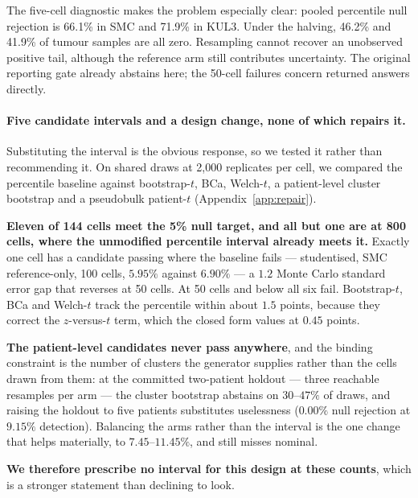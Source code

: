 The five-cell diagnostic makes the problem especially clear: pooled
percentile null rejection is 66.1\% in SMC and 71.9\% in KUL3.
Under the halving, 46.2\% and 41.9\% of tumour samples are all zero.
Resampling cannot recover an unobserved positive tail, although the reference
arm still contributes uncertainty. The original reporting gate already
abstains here; the 50-cell failures concern returned answers directly.

\paragraph{Five candidate intervals and a design change, none of which repairs
it.} Substituting the interval is the obvious response, so we tested it rather
than recommending it. On shared draws at 2{,}000 replicates per cell, we
compared the percentile baseline against bootstrap-$t$, BCa, Welch-$t$, a
patient-level cluster bootstrap and a pseudobulk patient-$t$
(Appendix~\ref{app:repair}).

\textbf{Eleven of 144 cells meet the 5\% null target, and all but one are at
800 cells, where the unmodified percentile interval already meets it.} Exactly
one cell has a candidate passing where the baseline fails --- studentised, SMC
reference-only, 100 cells, $5.95\%$ against $6.90\%$ --- a $1.2$ Monte Carlo
standard error gap that reverses at 50 cells. At 50 cells and below all six
fail. Bootstrap-$t$, BCa and Welch-$t$ track the percentile within about
$1.5$ points, because they correct the $z$-versus-$t$ term, which the closed
form values at $0.45$ points.

\textbf{The patient-level candidates never pass anywhere}, and the binding
constraint is the number of clusters the generator supplies rather than the
cells drawn from them: at the committed two-patient holdout --- three
reachable resamples per arm --- the cluster bootstrap abstains on $30$--$47\%$
of draws, and raising the holdout to five patients substitutes uselessness
($0.00\%$ null rejection at $9.15\%$ detection). Balancing the arms rather
than the interval is the one change that helps materially, to
$7.45$--$11.45\%$, and still misses nominal.

\textbf{We therefore prescribe no interval for this design at these
counts}, which is a stronger statement than declining to look.
